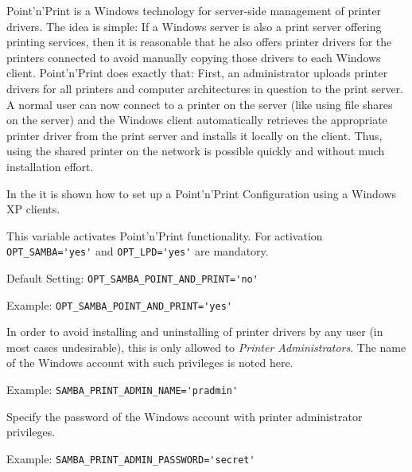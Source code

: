 Point'n'Print is a Windows technology for server-side management of
printer drivers. The idea is simple: If a Windows server is also a
print server offering printing services, then it is reasonable that
he also offers printer drivers for the printers connected to avoid
manually copying those drivers to each Windows client.
Point'n'Print does exactly that: First, an administrator uploads
printer drivers for all printers and computer architectures in question
to the print server. A normal user can now connect to a printer on the
server (like using file shares on the server) and the Windows client
automatically retrieves the appropriate printer driver from the print
server and installs it locally on the client. Thus, using the shared
printer on the network is possible quickly and without much
installation effort.

In the  it is shown how to
set up a Point'n'Print Configuration using a Windows XP clients.

\begin{description}


This variable activates Point'n'Print functionality. For activation
\verb+OPT_SAMBA='yes'+ and \verb+OPT_LPD='yes'+  are mandatory.

Default Setting: \verb+OPT_SAMBA_POINT_AND_PRINT='no'+

Example: \verb+OPT_SAMBA_POINT_AND_PRINT='yes'+


In order to avoid installing and uninstalling of printer drivers by any user
(in most cases undesirable), this is only allowed to \emph{Printer Administrators}.
The name of the Windows account with such privileges is noted here.

Example: \verb+SAMBA_PRINT_ADMIN_NAME='pradmin'+


Specify the password of the Windows account with printer administrator privileges.

Example: \verb+SAMBA_PRINT_ADMIN_PASSWORD='secret'+

\end{description}


